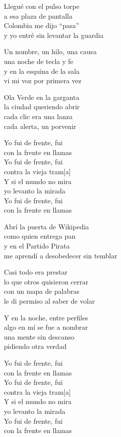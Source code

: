 \begin{lyrics}
Llegué con el pulso torpe\\
a esa plaza de pantalla\\
Colombia me dijo “pasa”\\
y yo entré sin levantar la guardia

Un nombre, un hilo, una causa\\
una noche de tecla y fe\\
y en la esquina de la sala\\
vi mi voz por primera vez

Ola Verde en la garganta\\
la ciudad queriendo abrir\\
cada clic era una lanza\\
cada alerta, un porvenir

Yo fui de frente, fui\\
con la frente en llamas\\
Yo fui de frente, fui\\
contra la vieja tram[a]\\
Y si el mundo no mira\\
yo levanto la mirada\\
Yo fui de frente, fui\\
con la frente en llamas

Abrí la puerta de Wikipedia\\
como quien entrega pan\\
y en el Partido Pirata\\
me aprendí a desobedecer sin temblar

Casi todo era prestar\\
lo que otros quisieron cerrar\\
con un mapa de palabras\\
le di permiso al saber de volar

Y en la noche, entre perfiles\\
algo en mí se fue a nombrar\\
una mente sin descanso\\
pidiendo otra verdad

Yo fui de frente, fui\\
con la frente en llamas\\
Yo fui de frente, fui\\
contra la vieja tram[a]\\
Y si el mundo no mira\\
yo levanto la mirada\\
Yo fui de frente, fui\\
con la frente en llamas


\end{lyrics}
